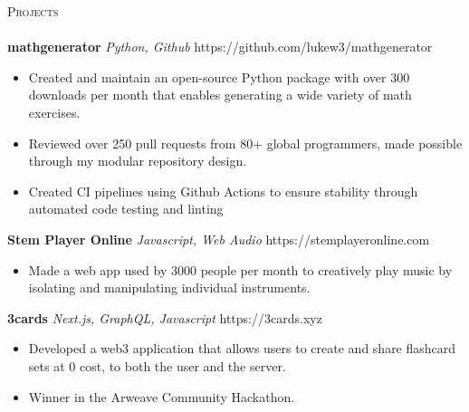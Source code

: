 \documentclass[letterpaper]{article}
\newcommand{\lineunder} {
    \vspace*{-8pt} \\
    \hspace*{-18pt} \hrulefill \\
}
\newcommand{\header} [1] {
    {\hspace*{-18pt}\vspace*{6pt} \textsc{#1}}
    \vspace*{-6pt} \lineunder
}
\begin{document}
\header{Projects}

    {\textbf{mathgenerator}} {\sl Python, Github} \hfill https://github.com/lukew3/mathgenerator\\
    \vspace{-2mm}
    \begin{itemize} \itemsep -1mm
    
        \item Created and maintain an open-source Python package with over 300 downloads per month that enables generating a wide variety of math exercises.

        \item Reviewed over 250 pull requests from 80+ global programmers, made possible through my modular repository design.

        \item Created CI pipelines using Github Actions to ensure stability through automated code testing and linting

    \end{itemize}
    \vspace{-2mm}

    {\textbf{Stem Player Online}} {\sl Javascript, Web Audio} \hfill https://stemplayeronline.com\\
    \vspace{-2mm}
    \begin{itemize} \itemsep -1mm

        \item Made a web app used by 3000 people per month to creatively play music by isolating and manipulating individual instruments.
        
    \end{itemize}
    \vspace{-2mm}

    {\textbf{3cards}} {\sl Next.js, GraphQL, Javascript} \hfill https://3cards.xyz\\
    \vspace{-2mm}
    \begin{itemize} \itemsep -1mm

        \item Developed a web3 application that allows users to create and share flashcard sets at 0 cost, to both the user and the server.
        \item Winner in the Arweave Community Hackathon.
            
    \end{itemize}
    \vspace{-2mm}
\end{document}
